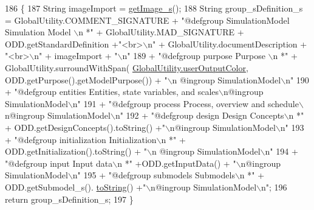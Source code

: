 \begin{DoxyCode}
186                                                \{
187         String imageImport = \hyperlink{classit_1_1isislab_1_1masonassisteddocumentation_1_1mason_1_1analizer_1_1_sim_state_analizer_abff770f4e110a106f049361915f1f390}{getImage\_s}();
188         String group\_sDefinition\_s = GlobalUtility.COMMENT\_SIGNATURE + \textcolor{stringliteral}{"@defgroup SimulationModel
       Simulation Model \(\backslash\)n *"} + GlobalUtility.MAD\_SIGNATURE + ODD.getStandardDefinition +\textcolor{stringliteral}{"<br>\(\backslash\)n"} + 
      GlobalUtility.documentDescription + \textcolor{stringliteral}{"<br>\(\backslash\)n"} + imageImport + \textcolor{stringliteral}{"\(\backslash\)n"}
189                 + \textcolor{stringliteral}{"@defgroup purpose Purpose \(\backslash\)n *"} + GlobalUtility.surroundWithSpan(
      \hyperlink{classit_1_1isislab_1_1masonassisteddocumentation_1_1mason_1_1analizer_1_1_global_utility_a0fcb324ae33eb93bd5b9177e342ecc82}{GlobalUtility.userOutputColor}, ODD.getPurpose().getModelPurpose()) + \textcolor{stringliteral}{"\(\backslash\)n
      @ingroup SimulationModel\(\backslash\)n"}
190                 + \textcolor{stringliteral}{"@defgroup entities Entities, state variables, and scales\(\backslash\)n@ingroup SimulationModel\(\backslash\)n"}
191                 + \textcolor{stringliteral}{"@defgroup process Process, overview and schedule\(\backslash\)n@ingroup SimulationModel\(\backslash\)n"}
192                 + \textcolor{stringliteral}{"@defgroup design Design Concepts\(\backslash\)n *"} + ODD.getDesignConcepts().toString() +\textcolor{stringliteral}{"\(\backslash\)n@ingroup
       SimulationModel\(\backslash\)n"}
193                 + \textcolor{stringliteral}{"@defgroup initialization Initialization\(\backslash\)n *"} + ODD.getInitialization().toString() + \textcolor{stringliteral}{"\(\backslash\)n
      @ingroup SimulationModel\(\backslash\)n"}
194                 + \textcolor{stringliteral}{"@defgroup input Input data\(\backslash\)n *"} +ODD.getInputData() + \textcolor{stringliteral}{"\(\backslash\)n@ingroup SimulationModel\(\backslash\)n"}
195                 + \textcolor{stringliteral}{"@defgroup submodels Submodels\(\backslash\)n *"} + ODD.getSubmodel\_s().
      \hyperlink{classit_1_1isislab_1_1masonassisteddocumentation_1_1mason_1_1analizer_1_1_sim_state_analizer_a14f8302dff6fb0e3a6230c7e53468f41}{toString}() +\textcolor{stringliteral}{"\(\backslash\)n@ingroup SimulationModel\(\backslash\)n"};
196         \textcolor{keywordflow}{return} group\_sDefinition\_s;
197     \}
\end{DoxyCode}


